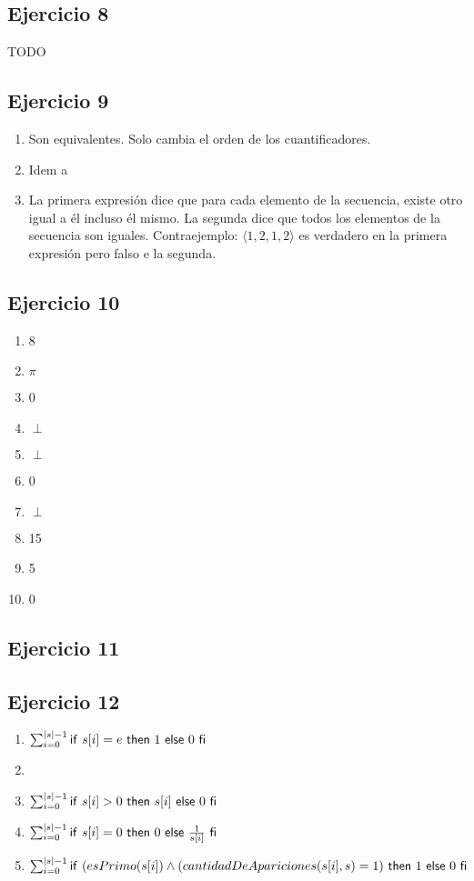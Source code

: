 \subsection{Ejercicio 8}
TODO

\subsection{Ejercicio 9}
\begin{enumerate}[label=(\alph*)]
    \item Son equivalentes. Solo cambia el orden de los cuantificadores.
    \item Idem a
    \item La primera expresión dice que para cada elemento de la secuencia, existe otro igual a él incluso él mismo. La segunda dice que
    todos los elementos de la secuencia son iguales. Contraejemplo: $\langle 1,2,1,2 \rangle$ es verdadero en la primera expresión pero falso e la segunda.
\end{enumerate}

\subsection{Ejercicio 10}
\begin{enumerate}[label=(\alph*)]
    \item 8
    \item $\pi$
    \item 0
    \item $\perp$
    \item $\perp$
    \item 0
    \item $\perp$
    \item 15
    \item 5
    \item 0
\end{enumerate}

\subsection{Ejercicio 11}

\subsection{Ejercicio 12}
\begin{enumerate}[label=(\alph*)]
    \item $\sum_{i=0}^{|s|-1}\mathsf{if}\ s[i]=e\ \mathsf{then}\ 1\ \mathsf{else}\ 0\ \mathsf{fi}$
    \item {}
    \item $\sum_{i=0}^{|s|-1}\mathsf{if}\ s[i] > 0\ \mathsf{then}\ s[i]\ \mathsf{else}\ 0\ \mathsf{fi}$
    \item $\sum_{i=0}^{|s|-1}\mathsf{if}\ s[i] = 0\ \mathsf{then}\ 0\ \mathsf{else}\ \frac{1}{s[i]}\ \mathsf{fi}$
    \item $\sum_{i=0}^{|s|-1}\mathsf{if}\ (esPrimo(s[i]) \wedge (cantidadDeApariciones(s[i], s)=1)\ \mathsf{then}\ 1\ \mathsf{else}\ 0\ \mathsf{fi}$
\end{enumerate}

